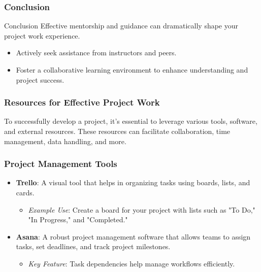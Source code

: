 \documentclass[aspectratio=169]{beamer}
\begin{document}
\begin{frame}[fragile]
    \frametitle{Conclusion}
    \begin{block}{Conclusion}
        Effective mentorship and guidance can dramatically shape your project work experience. 
        \begin{itemize}
            \item Actively seek assistance from instructors and peers.
            \item Foster a collaborative learning environment to enhance understanding and project success.
        \end{itemize}
    \end{block}
\end{frame}

\begin{frame}
    \frametitle{Resources for Effective Project Work}
    To successfully develop a project, it’s essential to leverage various tools, software, and external resources. These resources can facilitate collaboration, time management, data handling, and more.
\end{frame}

\begin{frame}[fragile]
    \frametitle{Project Management Tools}
    \begin{itemize}
        \item \textbf{Trello}: A visual tool that helps in organizing tasks using boards, lists, and cards.
        \begin{itemize}
            \item \textit{Example Use}: Create a board for your project with lists such as "To Do," "In Progress," and "Completed."
        \end{itemize}
        
        \item \textbf{Asana}: A robust project management software that allows teams to assign tasks, set deadlines, and track project milestones.
        \begin{itemize}
            \item \textit{Key Feature}: Task dependencies help manage workflows efficiently.
        \end{itemize}
    \end{itemize}
\end{frame}
\end{document}

